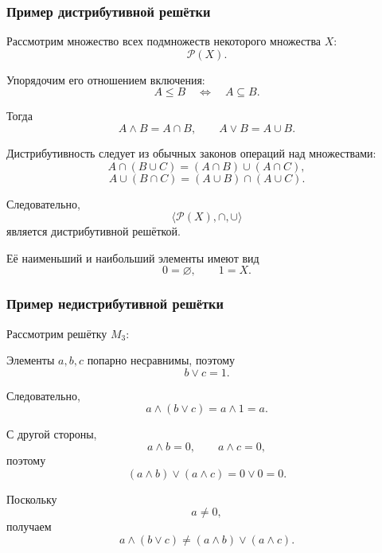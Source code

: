 \documentclass[12pt,a4paper,oneside,openany]{book}
\theoremstyle{definition}
\theoremstyle{plain}
\theoremstyle{remark}
\begin{document}
\subsubsection{Пример дистрибутивной решётки}

Рассмотрим множество всех подмножеств некоторого множества \(X\):
\[
\mathcal P(X).
\]

Упорядочим его отношением включения:
\[
A\leq B
\quad\Longleftrightarrow\quad
A\subseteq B.
\]

Тогда
\[
A\wedge B=A\cap B,
\qquad
A\vee B=A\cup B.
\]

Дистрибутивность следует из обычных законов операций над множествами:
\[
A\cap(B\cup C)
=
(A\cap B)\cup(A\cap C),
\]
\[
A\cup(B\cap C)
=
(A\cup B)\cap(A\cup C).
\]

Следовательно,
\[
\langle\mathcal P(X),\cap,\cup\rangle
\]
является дистрибутивной решёткой.

Её наименьший и наибольший элементы имеют вид
\[
0=\varnothing,
\qquad
1=X.
\]

\subsubsection{Пример недистрибутивной решётки}

Рассмотрим решётку \(M_3\):

\begin{center}
\end{center}

Элементы \(a,b,c\) попарно несравнимы, поэтому
\[
b\vee c=1.
\]

Следовательно,
\[
a\wedge(b\vee c)
=
a\wedge1
=
a.
\]

С другой стороны,
\[
a\wedge b=0,
\qquad
a\wedge c=0,
\]
поэтому
\[
(a\wedge b)\vee(a\wedge c)
=
0\vee0
=
0.
\]

Поскольку
\[
a\neq0,
\]
получаем
\[
a\wedge(b\vee c)
\neq
(a\wedge b)\vee(a\wedge c).
\]
\end{document}
